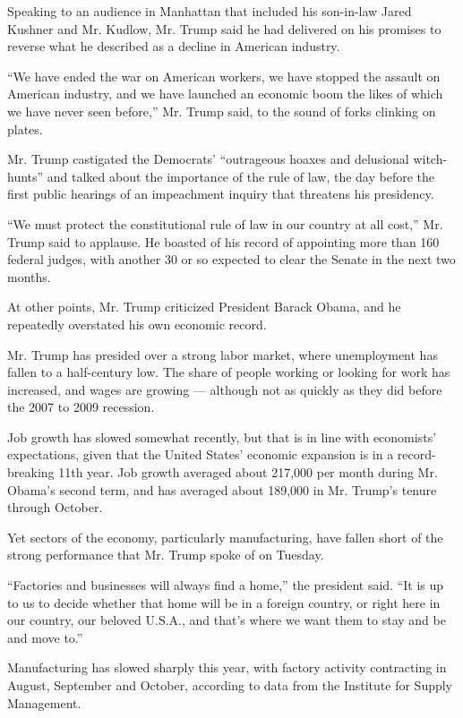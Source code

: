 Speaking to an audience in Manhattan that included his son-in-law Jared
Kushner and Mr. Kudlow, Mr. Trump said he had delivered on his promises
to reverse what he described as a decline in American industry.

``We have ended the war on American workers, we have stopped the assault
on American industry, and we have launched an economic boom the likes of
which we have never seen before,'' Mr. Trump said, to the sound of forks
clinking on plates.

Mr. Trump castigated the Democrats' ``outrageous hoaxes and delusional
witch-hunts'' and talked about the importance of the rule of law, the
day before the first public hearings of an impeachment inquiry that
threatens his presidency.

``We must protect the constitutional rule of law in our country at all
cost,'' Mr. Trump said to applause. He boasted of his record of
appointing more than 160 federal judges, with another 30 or so expected
to clear the Senate in the next two months.

At other points, Mr. Trump criticized President Barack Obama, and he
repeatedly overstated his own economic record.

Mr. Trump has presided over a strong labor market, where unemployment
has fallen to a half-century low. The share of people working or looking
for work has increased, and wages are growing --- although not as
quickly as they did before the 2007 to 2009 recession.

Job growth has slowed somewhat recently, but that is in line with
economists' expectations, given that the United States' economic
expansion is in a record-breaking 11th year. Job growth averaged about
217,000 per month during Mr. Obama's second term, and has averaged about
189,000 in Mr. Trump's tenure through October.

Yet sectors of the economy, particularly manufacturing, have fallen
short of the strong performance that Mr. Trump spoke of on Tuesday.

``Factories and businesses will always find a home,'' the president
said. ``It is up to us to decide whether that home will be in a foreign
country, or right here in our country, our beloved U.S.A., and that's
where we want them to stay and be and move to.''

Manufacturing has slowed sharply this year, with factory activity
contracting in August, September and October, according to data from the
Institute for Supply Management.

